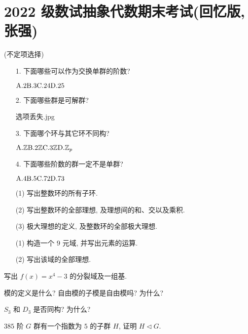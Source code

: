 \newpage
\section{2022 级数试抽象代数期末考试(回忆版, 张强)}

\problem[题目 1] (不定项选择)

\begin{itemize}
	\item[1.] 下面哪些可以作为交换单群的阶数?

	$\t A.2\hfil \t B. 3\hfil\t C. 24\hfil \t D.25$

	\item[2.] 下面哪些群是可解群?

	选项丢失.jpg

	\item[3.] 下面哪个环与其它环不同构?

	$\t A.\Z\hfil \t B. 2\Z\hfil\t C. 3\Z\hfil \t D.\Z_p$

	\item[4.] 下面哪些阶数的群一定不是单群?

	$\t A.4\hfil \t B. 5\hfil\t C. 72\hfil \t D.73$
\end{itemize}

\problem[题目 2]

\begin{itemize}
	\item[(1)] 写出整数环的所有子环.

	\item[(2)] 写出整数环的全部理想, 及理想间的和、交以及乘积.

	\item[(3)] 极大理想的定义, 及整数环的全部极大理想.
\end{itemize}

\problem[题目 3]

\begin{itemize}
	\item[(1)] 构造一个 $9$ 元域, 并写出元素的运算.

	\item[(2)] 写出该域的全部理想.
\end{itemize}

\problem[题目 4] 写出 $f(x)=x^4-3$ 的分裂域及一组基.

\problem[题目 5] 模的定义是什么? 自由模的子模是自由模吗? 为什么?

\problem[题目 6] $S_3$ 和 $D_3$ 是否同构? 为什么?

\problem[题目 7] $385$ 阶 $G$ 群有一个指数为 $5$ 的子群 $H$, 证明 $H\lhd G$.

